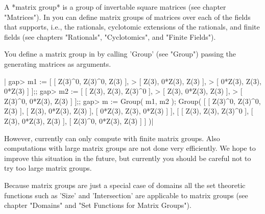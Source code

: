 
A *matrix group* is  a group of invertable square  matrices (see  chapter
"Matrices").   In {\GAP}  you can define matrix  groups of matrices  over
each of the fields that {\GAP} supports, i.e., the  rationals, cyclotomic
extensions of the rationals, and finite fields (see chapters "Rationals",
"Cyclotomics", and "Finite Fields").

You  define a matrix  group in {\GAP} by calling  'Group'  (see  "Group")
passing the generating matrices as arguments.

|    gap> m1 := [ [ Z(3)^0, Z(3)^0,   Z(3) ],
    >            [   Z(3), 0*Z(3),   Z(3) ],
    >            [ 0*Z(3),   Z(3), 0*Z(3) ] ];;
    gap> m2 := [ [   Z(3),   Z(3), Z(3)^0 ],
    >            [   Z(3), 0*Z(3),   Z(3) ],
    >            [ Z(3)^0, 0*Z(3),   Z(3) ] ];;
    gap> m := Group( m1, m2 );
    Group( [ [ Z(3)^0, Z(3)^0, Z(3) ], [ Z(3), 0*Z(3), Z(3) ],
      [ 0*Z(3), Z(3), 0*Z(3) ] ],
    [ [ Z(3), Z(3), Z(3)^0 ], [ Z(3), 0*Z(3), Z(3) ],
      [ Z(3)^0, 0*Z(3), Z(3) ] ] )|

However,  currently {\GAP} can only  compute  with finite  matrix groups.
Also computations with large matrix groups are not done very efficiently.
We hope to improve this situation in the future, but currently you should
be careful not to try too large matrix groups.

Because  matrix  groups are just a special  case of  domains  all the set
theoretic functions such as 'Size' and  'Intersection'  are applicable to
matrix  groups  (see chapter  "Domains"  and  "Set  Functions for  Matrix
Groups").

